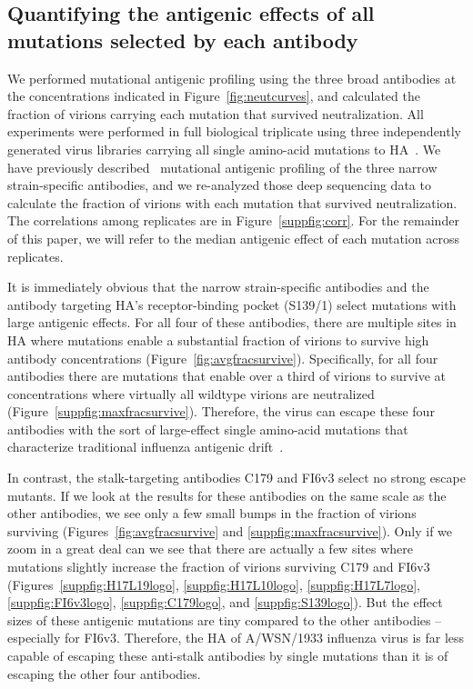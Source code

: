 \documentclass[11pt]{article}
\begin{document}
\subsection*{Quantifying the antigenic effects of all mutations selected by each antibody}
We performed mutational antigenic profiling using the three broad antibodies at the concentrations indicated in Figure~\ref{fig:neutcurves}, and calculated the fraction of virions carrying each mutation that survived neutralization. 
All experiments were performed in full biological triplicate using three independently generated virus libraries carrying all single amino-acid mutations to HA~\citep{doud2016accurate}.
We have previously described~\citep{doud2017complete} mutational antigenic profiling of the three narrow strain-specific antibodies, and we re-analyzed those deep sequencing data to calculate the fraction of virions with each mutation that survived neutralization.
The correlations among replicates are in Figure~\ref{suppfig:corr}.
For the remainder of this paper, we will refer to the median antigenic effect of each mutation across replicates.

It is immediately obvious that the narrow strain-specific antibodies and the antibody targeting HA's receptor-binding pocket (S139/1) select mutations with large antigenic effects.
For all four of these antibodies, there are multiple sites in HA where mutations enable a substantial fraction of virions to survive high antibody concentrations (Figure~\ref{fig:avgfracsurvive}).
Specifically, for all four antibodies there are mutations that enable over a third of virions to survive at concentrations where virtually all wildtype virions are neutralized (Figure~\ref{suppfig:maxfracsurvive}).
Therefore, the virus can escape these four antibodies with the sort of large-effect single amino-acid mutations that characterize traditional influenza antigenic drift~\citep{yewdell1979antigenic,webster1980determination,koel2013substitutions,chambers2015identification,petrie2016antibodies,neher2016prediction}.  

In contrast, the stalk-targeting antibodies C179 and FI6v3 select no strong escape mutants. 
If we look at the results for these antibodies on the same scale as the other antibodies, we see only a few small bumps in the fraction of virions surviving (Figures~\ref{fig:avgfracsurvive} and \ref{suppfig:maxfracsurvive}).
Only if we zoom in a great deal can we see that there are actually a few sites where mutations slightly increase the fraction of virions surviving C179 and FI6v3 (Figures~\ref{suppfig:H17L19logo}, \ref{suppfig:H17L10logo}, \ref{suppfig:H17L7logo}, \ref{suppfig:FI6v3logo}, \ref{suppfig:C179logo}, and \ref{suppfig:S139logo}).
But the effect sizes of these antigenic mutations are tiny compared to the other antibodies -- especially for FI6v3.
Therefore, the HA of A/WSN/1933 influenza virus is far less capable of escaping these anti-stalk antibodies by single mutations than it is of escaping the other four antibodies. 
\end{document}

